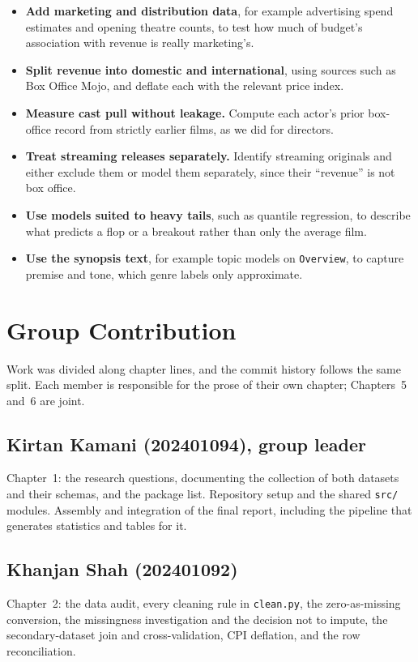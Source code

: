 \documentclass[a4paper,12pt]{report}
\newcommand{\code}[1]{\texttt{#1}}
\begin{document}
\begin{itemize}
  \item \textbf{Add marketing and distribution data}, for example advertising spend estimates and opening theatre counts, to test how much of budget's association with revenue is really marketing's.
  \item \textbf{Split revenue into domestic and international}, using sources such as Box Office Mojo, and deflate each with the relevant price index.
  \item \textbf{Measure cast pull without leakage.} Compute each actor's prior box-office record from strictly earlier films, as we did for directors.
  \item \textbf{Treat streaming releases separately.} Identify streaming originals and either exclude them or model them separately, since their ``revenue'' is not box office.
  \item \textbf{Use models suited to heavy tails}, such as quantile regression, to describe what predicts a flop or a breakout rather than only the average film.
  \item \textbf{Use the synopsis text}, for example topic models on \code{Overview}, to capture premise and tone, which genre labels only approximate.
\end{itemize}

\chapter*{Group Contribution }

Work was divided along chapter lines, and the commit history follows the same split. Each member is responsible for the prose of their own chapter; Chapters~5 and~6 are joint.

\section*{Kirtan Kamani (202401094), group leader}
Chapter~1: the research questions, documenting the collection of both datasets and their schemas, and the package list. Repository setup and the shared \code{src/} modules. Assembly and integration of the final report, including the pipeline that generates statistics and tables for it.

\section*{Khanjan Shah (202401092)}
Chapter~2: the data audit, every cleaning rule in \code{clean.py}, the zero-as-missing conversion, the missingness investigation and the decision not to impute, the secondary-dataset join and cross-validation, CPI deflation, and the row reconciliation.
\end{document}
